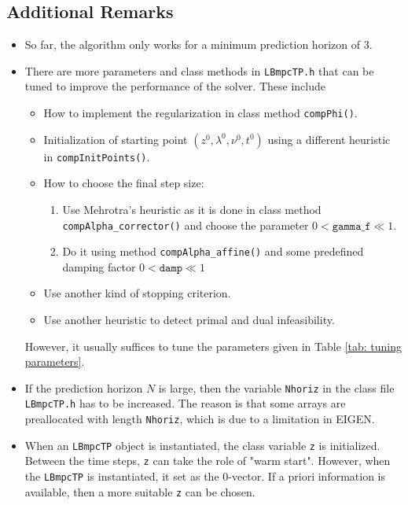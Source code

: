 \documentclass[letter]{article}
\begin{document}
\begin{sffamily}
\subsection{Additional Remarks}
\begin{itemize}
	\item So far, the algorithm only works for a minimum prediction horizon of $3$.
	\item There are more parameters and class methods in \texttt{LBmpcTP.h} that can be tuned to improve the performance of the solver. These include
	\begin{itemize}
		\item How to implement the regularization in class method \texttt{compPhi()}.
		\item Initialization of starting point $(z^0,\lambda^0,\nu^0,t^0)$ using a different heuristic in \texttt{compInitPoints()}.
		\item How to choose the final step size: 
		\begin{enumerate}
			\item Use Mehrotra's heuristic as it is done in  class method \texttt{compAlpha\_corrector()} and choose the parameter $0<\texttt{gamma\_f}\ll 1$.
			\item Do it using method \texttt{compAlpha\_affine()} and some predefined damping factor $0<\texttt{damp}\ll 1$
		\end{enumerate}
		\item Use another kind of stopping criterion.
		\item Use another heuristic to detect primal and dual infeasibility.
	\end{itemize}		
 However, it usually suffices to tune  the parameters given in Table \eqref{tab: tuning parameters}.
 
	\item If the prediction horizon $N$ is large, then the variable \texttt{Nhoriz} in the class file \texttt{LBmpcTP.h} has to be increased. The reason is that some arrays are preallocated with length \texttt{Nhoriz}, which is due to a limitation in EIGEN.
	
	\item When an \texttt{LBmpcTP} object is instantiated, the class variable \texttt{z} is initialized. Between the time steps, \texttt{z} can take  the role of "warm start". However, when the \texttt{LBmpcTP} is instantiated, it set as the $0$-vector. If a priori information is available, then a more suitable \texttt{z} can be chosen.
\end{itemize}




\end{sffamily}
\end{document}
